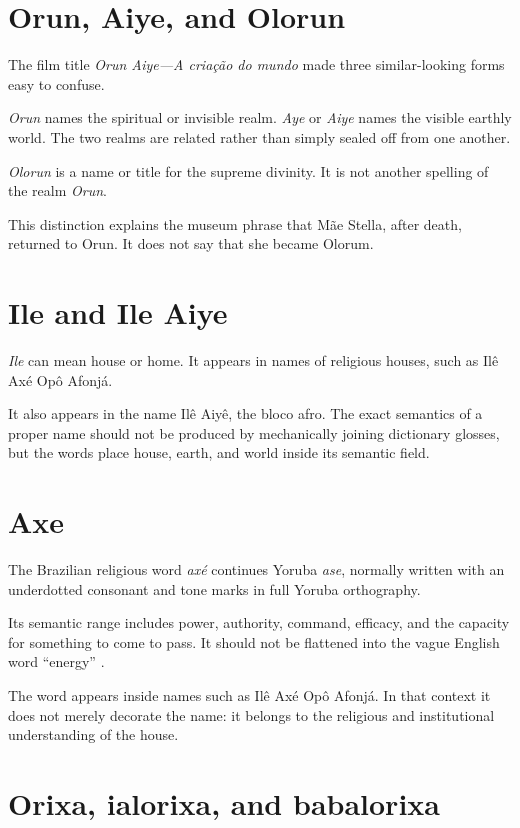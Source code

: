 \section{Orun, Aiye, and Olorun}
\label{section-languages-orun-aiye}

The film title
\emph{Orun Aiye---A cria\c{c}\~ao do mundo}
made three similar-looking forms easy to
confuse.

\emph{Orun} names the spiritual or
invisible realm.  \emph{Aye} or
\emph{Aiye} names the visible earthly
world.  The two realms are related rather
than simply sealed off from one another.

\emph{Olorun} is a name or title for the
supreme divinity.  It is not another
spelling of the realm \emph{Orun}.

This distinction explains the museum
phrase that M\~ae Stella, after death,
returned to Orun.  It does not say that she
became Olorum.

\section{Ile and Ile Aiye}
\label{section-languages-ile-aiye}

\emph{Ile} can mean house or home.  It
appears in names of religious houses, such
as Il\^e Ax\'e Op\^o Afonj\'a.

It also appears in the name Il\^e Aiy\^e,
the bloco afro.  The exact semantics of a
proper name should not be produced by
mechanically joining dictionary glosses,
but the words place house, earth, and world
inside its semantic field.

\section{Axe}
\label{section-languages-axe}

The Brazilian religious word
\emph{ax\'e} continues Yoruba
\emph{ase}, normally written with an
underdotted consonant and tone marks in
full Yoruba orthography.

Its semantic range includes power,
authority, command, efficacy, and the
capacity for something to come to pass. It
should not be flattened into the vague
English word ``energy''
\cite{abiodun2014yoruba}.

The word appears inside names such as
Il\^e Ax\'e Op\^o Afonj\'a. In that
context it does not merely decorate the
name: it belongs to the religious and
institutional understanding of the house.

\section{Orixa, ialorixa, and babalorixa}
\label{section-languages-ialorixa}

